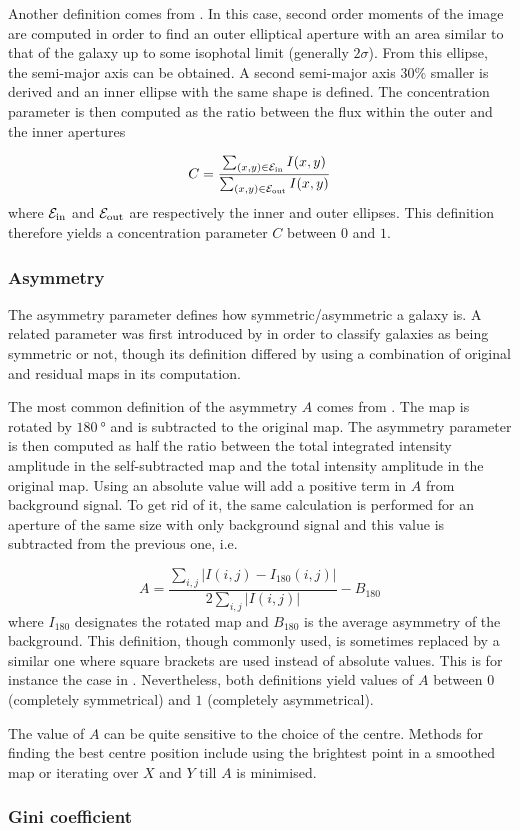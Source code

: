 Another definition comes from . In this case, second order moments of the image are computed in order to find an outer elliptical aperture with an area similar to that of the galaxy up to some isophotal limit (generally $2\sigma$). From this ellipse, the semi-major axis can be obtained. A second semi-major axis $30\%$ smaller is derived and an inner ellipse with the same shape is defined. The concentration parameter is then computed as the ratio between the flux within the outer and the inner apertures

\begin{equation}
	C = \frac{\sum_{(x, y) \in \rm{\mathcal{E}_{in}}} I(x, y)}{\sum_{(x, y) \in \rm{\mathcal{E}_{out}}} I(x, y)}
	\label{eq:concentration_abraham_form}
\end{equation}
where $\rm{\mathcal{E}_{in}}$ and $\rm{\mathcal{E}_{out}}$ are respectively the inner and outer ellipses. This definition therefore yields a concentration parameter $C$ between $0$ and $1$.

\subsubsection{Asymmetry}

The asymmetry parameter defines how symmetric/asymmetric a galaxy is. A related parameter was first introduced by  in order to classify galaxies as being symmetric or not, though its definition differed by using a combination of original and residual maps in its computation.

The most common definition of the asymmetry $A$ comes from . The map is rotated by $\SI{180}{\degree}$ and is subtracted to the original map. The asymmetry parameter is then computed as half the ratio between the total integrated intensity amplitude in the self-subtracted map and the total intensity amplitude in the original map. Using an absolute value will add a positive term in $A$ from background signal. To get rid of it, the same calculation is performed for an aperture of the same size with only background signal and this value is subtracted from the previous one, i.e.

\begin{equation}
	A = \frac{\sum_{i , j} \left | I(i,j) - I_{180} (i , j) \right | }{2 \sum_{i, j} \left | I(i,j) \right |} - B_{180}
\end{equation}
where $I_{180}$ designates the rotated map and $B_{180}$ is the average asymmetry of the background. This definition, though commonly used, is sometimes replaced by a similar one where square brackets are used instead of absolute values. This is for instance the case in . Nevertheless, both definitions yield values of $A$ between $0$ (completely symmetrical) and $1$ (completely asymmetrical).

The value of $A$ can be quite sensitive to the choice of the centre. Methods for finding the best centre position include using the brightest point in a smoothed map or iterating over $X$ and $Y$ till $A$ is minimised.

\subsubsection{Gini coefficient}

